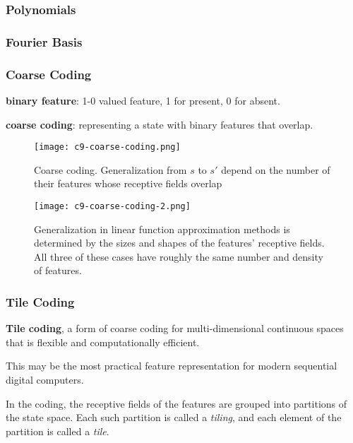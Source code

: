 \documentclass[sutton_barto_notes.tex]{subfiles}
\begin{document}
\subsubsection{Polynomials}
\subsubsection{Fourier Basis}
\subsubsection{Coarse Coding}

\begin{definition}
\textbf{binary feature}: 1-0 valued feature, 1 for present, 0 for absent.
\end{definition}
\begin{definition}
\textbf{coarse coding}: representing a state with binary features that overlap.
\end{definition}

\begin{figure}[h!]
  \texttt{[image: c9-coarse-coding.png]}
  \caption{Coarse coding. Generalization from $s$ to $s'$ depend on the number of their features whose receptive fields overlap}
  \label{fig:coarse-coding}
\end{figure}

\begin{figure}[h!]
  \texttt{[image: c9-coarse-coding-2.png]}
  \caption{Generalization in linear function approximation methods is determined by the sizes and shapes of the features' receptive fields. All three of these cases have roughly the same number and density of features.}
  \label{fig:coarse-coding}
\end{figure}

\subsubsection{Tile Coding}

\begin{definition}
\textbf{Tile coding}, a form of coarse coding for multi-dimensional continuous spaces that is flexible and computationally efficient.
\end{definition}
This may be the most practical feature representation for modern sequential digital computers.

In the coding, the receptive fields of the features are grouped into partitions of the state space. Each such partition is called a \textit{tiling}, and each element of the partition is called a \textit{tile}.
\end{document}
